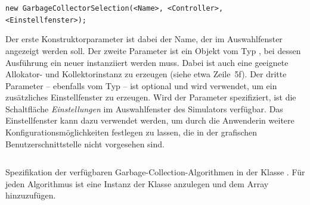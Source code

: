 \vspace*{-0.5cm}
\begin{center}
	\texttt{new GarbageCollectorSelection(<Name>, <Controller>, <Einstellfenster>);}
\end{center}

\vspace*{-0.5cm}
Der erste Konstruktorparameter ist dabei der Name, der im Auswahlfenster angezeigt werden soll.
Der zweite Parameter ist ein Objekt vom Typ , bei dessen Ausführung ein neuer  instanziiert werden muss.
Dabei ist auch eine geeignete Allokator- und Kollektorinstanz zu erzeugen (siehe etwa Zeile~5f).
Der dritte Parameter -- ebenfalls vom Typ  -- ist optional und wird verwendet, um ein zusätzliches Einstellfenster zu erzeugen.
Wird der Parameter spezifiziert, ist die Schaltfläche \textit{Einstellungen} im Auswahlfenster des Simulators verfügbar.
Das Einstellfenster kann dazu verwendet werden, um durch die Anwenderin weitere Konfigurationsmöglichkeiten festlegen zu lassen, die in der grafischen Benutzerschnittstelle nicht vorgesehen sind.

\begin{listing}[h]
	\inputminted[]{java}{code/CollectorSelection.java}
	\caption[Spezifikation der verfügbaren Algorithmen]{Spezifikation der verfügbaren Garbage-Collection-Algorithmen in der Klasse . Für jeden Algorithmus ist eine Instanz der Klasse  anzulegen und dem Array  hinzuzufügen.}
	\label{java:selection}
\end{listing}
